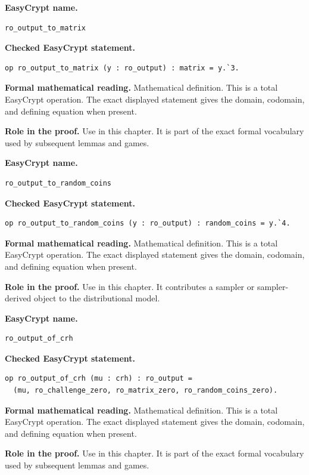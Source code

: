 \begin{formaldefinition}
\noindent\textbf{EasyCrypt name.}
\begin{lstlisting}[language=EasyCrypt,basicstyle=\ttfamily\scriptsize]
ro_output_to_matrix
\end{lstlisting}
\noindent\textbf{Checked EasyCrypt statement.}
\begin{lstlisting}[language=EasyCrypt,basicstyle=\ttfamily\scriptsize]
op ro_output_to_matrix (y : ro_output) : matrix = y.`3.
\end{lstlisting}
\noindent\textbf{Formal mathematical reading.}
Mathematical definition. This is a total EasyCrypt operation.  The exact displayed statement gives the domain, codomain, and defining equation when present.

\noindent\textbf{Role in the proof.}
Use in this chapter. It is part of the exact formal vocabulary used by subsequent lemmas and games.

\end{formaldefinition}

\begin{formaldefinition}
\noindent\textbf{EasyCrypt name.}
\begin{lstlisting}[language=EasyCrypt,basicstyle=\ttfamily\scriptsize]
ro_output_to_random_coins
\end{lstlisting}
\noindent\textbf{Checked EasyCrypt statement.}
\begin{lstlisting}[language=EasyCrypt,basicstyle=\ttfamily\scriptsize]
op ro_output_to_random_coins (y : ro_output) : random_coins = y.`4.
\end{lstlisting}
\noindent\textbf{Formal mathematical reading.}
Mathematical definition. This is a total EasyCrypt operation.  The exact displayed statement gives the domain, codomain, and defining equation when present.

\noindent\textbf{Role in the proof.}
Use in this chapter. It contributes a sampler or sampler-derived object to the distributional model.

\end{formaldefinition}

\begin{formaldefinition}
\noindent\textbf{EasyCrypt name.}
\begin{lstlisting}[language=EasyCrypt,basicstyle=\ttfamily\scriptsize]
ro_output_of_crh
\end{lstlisting}
\noindent\textbf{Checked EasyCrypt statement.}
\begin{lstlisting}[language=EasyCrypt,basicstyle=\ttfamily\scriptsize]
op ro_output_of_crh (mu : crh) : ro_output =
  (mu, ro_challenge_zero, ro_matrix_zero, ro_random_coins_zero).
\end{lstlisting}
\noindent\textbf{Formal mathematical reading.}
Mathematical definition. This is a total EasyCrypt operation.  The exact displayed statement gives the domain, codomain, and defining equation when present.

\noindent\textbf{Role in the proof.}
Use in this chapter. It is part of the exact formal vocabulary used by subsequent lemmas and games.

\end{formaldefinition}

